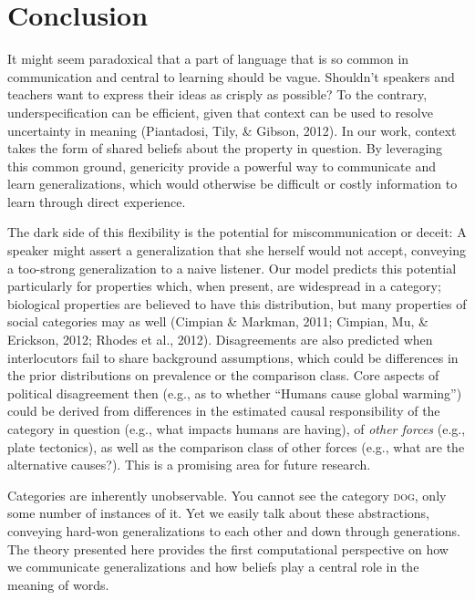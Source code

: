 \documentclass[english,floatsintext,man]{apa6}
\theoremstyle{definition}
\theoremstyle{definition}
\theoremstyle{definition}
\theoremstyle{remark}
\begin{document}
\section{Conclusion}\label{conclusion}

It might seem paradoxical that a part of language that is so common in
communication and central to learning should be vague. Shouldn't
speakers and teachers want to express their ideas as crisply as
possible? To the contrary, underspecification can be efficient, given
that context can be used to resolve uncertainty in meaning (Piantadosi,
Tily, \& Gibson, 2012). In our work, context takes the form of shared
beliefs about the property in question. By leveraging this common
ground, genericity provide a powerful way to communicate and learn
generalizations, which would otherwise be difficult or costly
information to learn through direct experience.

The dark side of this flexibility is the potential for miscommunication
or deceit: A speaker might assert a generalization that she herself
would not accept, conveying a too-strong generalization to a naive
listener. Our model predicts this potential particularly for properties
which, when present, are widespread in a category; biological properties
are believed to have this distribution, but many properties of social
categories may as well (Cimpian \& Markman, 2011; Cimpian, Mu, \&
Erickson, 2012; Rhodes et al., 2012). Disagreements are also predicted
when interlocutors fail to share background assumptions, which could be
differences in the prior distributions on prevalence or the comparison
class. Core aspects of political disagreement then (e.g., as to whether
\enquote{Humans cause global warming}) could be derived from differences
in the estimated causal responsibility of the category in question
(e.g., what impacts humans are having), of \emph{other forces} (e.g.,
plate tectonics), as well as the comparison class of other forces (e.g.,
what are the alternative causes?). This is a promising area for future
research.

Categories are inherently unobservable. You cannot see the category
\textsc{dog}, only some number of instances of it. Yet we easily talk
about these abstractions, conveying hard-won generalizations to each
other and down through generations. The theory presented here provides
the first computational perspective on how we communicate
generalizations and how beliefs play a central role in the meaning of
words.

\newpage
\end{document}
